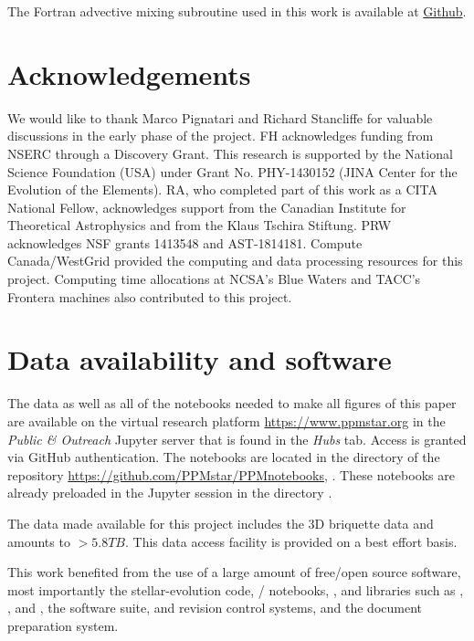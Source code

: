 \documentclass[fleqn,usenatbib]{mnras}
\begin{document}
The Fortran advective mixing subroutine used in this work is available at \href{https://github.com/David-Stephens/two-stream-mixing}{Github}.

\section*{Acknowledgements}

We would like to thank Marco Pignatari and Richard Stancliffe for valuable
discussions in the early phase of the project. FH acknowledges funding
from NSERC through a Discovery Grant. This research is supported by
the National Science Foundation (USA) under Grant No. PHY-1430152
(JINA Center for the Evolution of the Elements). RA, who completed
part of this work as a CITA National Fellow, acknowledges support from
the Canadian Institute for Theoretical Astrophysics and from the Klaus
Tschira Stiftung. PRW acknowledges NSF grants 1413548
and AST-1814181. Compute Canada/WestGrid provided the computing and data
processing resources for this project. Computing time allocations at
NCSA's Blue Waters and TACC's Frontera machines also contributed to
this project. 

\section*{Data availability and software}
The data as well as all of the notebooks needed to make all 
figures of this paper are available on the virtual research platform  
\url{https://www.ppmstar.org} in the \emph{Public \& Outreach} Jupyter server that 
is found in the 
\emph{Hubs} tab. Access is granted via GitHub authentication. The notebooks are located in 
the directory 
of the repository \url{https://github.com/PPMstar/PPMnotebooks}, . These notebooks are already preloaded 
 in the Jupyter session in the directory . 

The data made available for this project includes the 3D briquette data and amounts to $>\unit{5.8}{TB}$. This data access facility is provided on a best effort basis. 

This work benefited from the use of a large amount of
free/open source software, most importantly the  stellar-evolution code,
/ notebooks, ,  and 
libraries such as , , 
 and ,
the  software suite,  and  
revision control systems, and the
 document preparation system.
\end{document}
